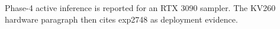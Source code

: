 Phase-4 active inference is reported for an RTX 3090 sampler.
The KV260 hardware paragraph then cites exp2748 as deployment evidence.
